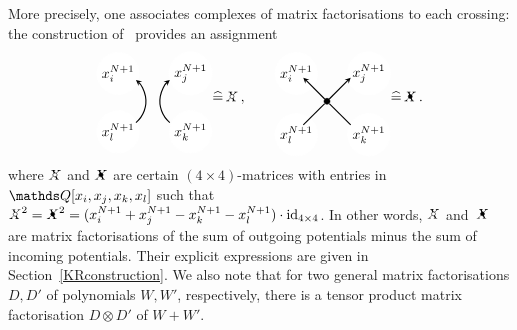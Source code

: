 \documentclass{compositio}
\theoremstyle{definition}
\numberwithin{equation}{section}
\begin{document}
More precisely, one associates complexes of matrix factorisations to each crossing: the construction of~\cite{kr0401268} provides an assignment
\begin{equation}
\label{DeltaX}
\begin{tikzpicture}[scale=0.7,baseline, inner sep=1mm, >=stealth]
\node (1) at (-2.5,1.0) [circle,inner sep=1.5pt, draw=white,fill= white] {$x^{N+1}_{i}$};
\node (2) at (0.1,1.0) [circle,inner sep=1.5pt, draw=white,fill= white] {$x^{N+1}_{j}$};
\node (3) at (0.1,-1.1) [circle,inner sep=1.5pt, draw=white,fill= white] {$x^{N+1}_{k}$};
\node (3) at (-2.5,-1.1) [circle,inner sep=1.5pt, draw=white,fill= white] {$x^{N+1}_{l}$};
\draw[ ->, thick, shift={(-2.5,0)} ]  (-50:1) arc (-50:50:1); 
\draw[ ->, thick ] (230:1) arc (230:130:1); 
\end{tikzpicture}
\widehat = \,
\Xcirc \, ,
\qquad 
\begin{tikzpicture}[scale=0.7,baseline, inner sep=1mm, >=stealth]
\node (1) at (-1.1,1.0) [circle,inner sep=1.5pt, draw=white,fill= white] {$x^{N+1}_{i}$};
\node (2) at (1.5,1.0) [circle,inner sep=1.5pt, draw=white,fill= white] {$x^{N+1}_{j}$};
\node (3) at (1.5,-1.2) [circle,inner sep=1.5pt, draw=white,fill= white] {$x^{N+1}_{k}$};
\node (3) at (-1.1,-1.2) [circle,inner sep=1.5pt, draw=white,fill= white] {$x^{N+1}_{l}$};
\node (0) at (0,0) [circle,inner sep=1.5pt, thin,draw=black,fill= black] {};
\node (bl) at (-1,-1) [circle] {};
\node (br) at (1,-1) [circle] {};
\node (tl) at (-1,1) [circle] {};
\node (tr) at (1,1) [circle] {};
\draw[-,  thick] (bl) -- (0); 
\draw[-,  thick] (br) -- (0); 
\draw[->,  thick] (0) -- (tl); 
\draw[->,  thick] (0) -- (tr); 
\end{tikzpicture}
\widehat = \,
\Xbul\,.
\end{equation}
where $\Xcirc$ and $\Xbul$ are certain $(4\times 4)$-matrices with entries in $\nQ[x_{i},x_{j},x_{k},x_{l}]$ such that $\Xcirc^2=\Xbul^2 = (x^{N+1}_{i}+x^{N+1}_{j}-x^{N+1}_{k}-x^{N+1}_{l})\cdot\operatorname{id}_{4\times 4}$. In other words, $\Xcirc$ and~$\Xbul$ are matrix factorisations of the sum of outgoing potentials minus the sum of incoming potentials. Their explicit expressions are given in Section~\ref{KRconstruction}. We also note that for two general matrix factorisations $D,D'$  of polynomials $W,W'$, respectively, there is a tensor product matrix factorisation $D\otimes D'$ of $W+W'$. 
\end{document}
